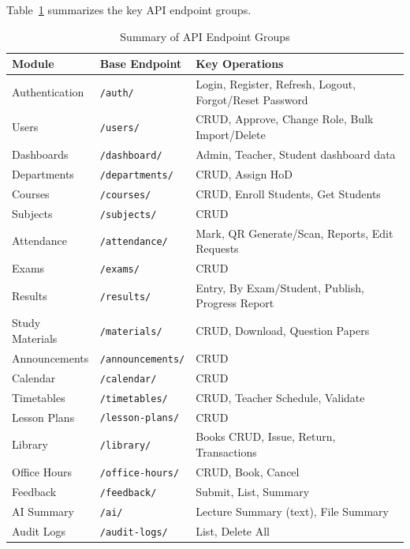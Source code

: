 Table~\ref{tab:api_endpoints} summarizes the key API endpoint groups.

\begin{table}[H]
\centering
\caption{Summary of API Endpoint Groups}
\label{tab:api_endpoints}
\footnotesize
\begin{tabular}{|p{3.5cm}|p{4cm}|p{6cm}|}
\hline
\textbf{Module} & \textbf{Base Endpoint} & \textbf{Key Operations} \\
\hline
Authentication & \texttt{/auth/} & Login, Register, Refresh, Logout, Forgot/Reset Password \\
\hline
Users & \texttt{/users/} & CRUD, Approve, Change Role, Bulk Import/Delete \\
\hline
Dashboards & \texttt{/dashboard/} & Admin, Teacher, Student dashboard data \\
\hline
Departments & \texttt{/departments/} & CRUD, Assign HoD \\
\hline
Courses & \texttt{/courses/} & CRUD, Enroll Students, Get Students \\
\hline
Subjects & \texttt{/subjects/} & CRUD \\
\hline
Attendance & \texttt{/attendance/} & Mark, QR Generate/Scan, Reports, Edit Requests \\
\hline
Exams & \texttt{/exams/} & CRUD \\
\hline
Results & \texttt{/results/} & Entry, By Exam/Student, Publish, Progress Report \\
\hline
Study Materials & \texttt{/materials/} & CRUD, Download, Question Papers \\
\hline
Announcements & \texttt{/announcements/} & CRUD \\
\hline
Calendar & \texttt{/calendar/} & CRUD \\
\hline
Timetables & \texttt{/timetables/} & CRUD, Teacher Schedule, Validate \\
\hline
Lesson Plans & \texttt{/lesson-plans/} & CRUD \\
\hline
Library & \texttt{/library/} & Books CRUD, Issue, Return, Transactions \\
\hline
Office Hours & \texttt{/office-hours/} & CRUD, Book, Cancel \\
\hline
Feedback & \texttt{/feedback/} & Submit, List, Summary \\
\hline
AI Summary & \texttt{/ai/} & Lecture Summary (text), File Summary \\
\hline
Audit Logs & \texttt{/audit-logs/} & List, Delete All \\
\hline
\end{tabular}
\end{table}


